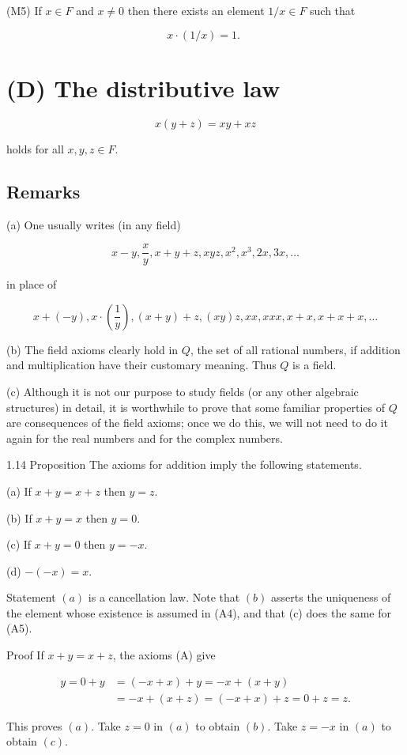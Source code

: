 \documentclass[10pt]{article}
\begin{document}
(M5) If $x \in F$ and $x \neq 0$ then there exists an element $1 / x \in F$ such that

$$
x \cdot(1 / x)=1 \text {. }
$$

\section{(D) The distributive law}
$$
x(y+z)=x y+x z
$$

holds for all $x, y, z \in F$.

\subsection{Remarks}
(a) One usually writes (in any field)

$$
x-y, \frac{x}{y}, x+y+z, x y z, x^{2}, x^{3}, 2 x, 3 x, \ldots
$$

in place of

$$
x+(-y), x \cdot\left(\frac{1}{y}\right),(x+y)+z,(x y) z, x x, x x x, x+x, x+x+x, \ldots
$$

(b) The field axioms clearly hold in $Q$, the set of all rational numbers, if addition and multiplication have their customary meaning. Thus $Q$ is a field.

(c) Although it is not our purpose to study fields (or any other algebraic structures) in detail, it is worthwhile to prove that some familiar properties of $Q$ are consequences of the field axioms; once we do this, we will not need to do it again for the real numbers and for the complex numbers.

1.14 Proposition The axioms for addition imply the following statements.

(a) If $x+y=x+z$ then $y=z$.

(b) If $x+y=x$ then $y=0$.

(c) If $x+y=0$ then $y=-x$.

(d) $-(-x)=x$.

Statement $(a)$ is a cancellation law. Note that $(b)$ asserts the uniqueness of the element whose existence is assumed in (A4), and that (c) does the same for (A5).

Proof If $x+y=x+z$, the axioms (A) give

$$
\begin{aligned}
y=0+y & =(-x+x)+y=-x+(x+y) \\
& =-x+(x+z)=(-x+x)+z=0+z=z .
\end{aligned}
$$

This proves $(a)$. Take $z=0$ in $(a)$ to obtain $(b)$. Take $z=-x$ in $(a)$ to obtain $(c)$.
\end{document}
